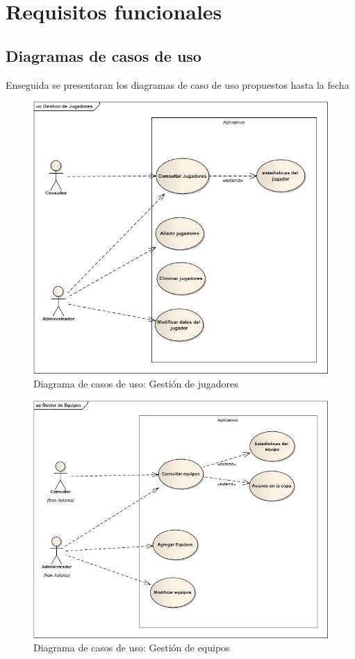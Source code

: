 \section{Requisitos funcionales}


\subsection{Diagramas de casos de uso}
Enseguida se presentaran los diagramas de caso de uso propuestos hasta la fecha

\begin{figure}[H]
	\centering
	\includegraphics[width=0.8\linewidth]{Designe/imgs/gestionJ}
	\caption{Diagrama de casos de uso: Gestión de jugadores}
	\label{fig:gestionj}
\end{figure}

\begin{figure}[H]
	\centering
	\includegraphics[width=0.8\linewidth]{Designe/imgs/gestionE}
	\caption{Diagrama de casos de uso: Gestión de equipos}
	\label{fig:gestionE}
\end{figure}

